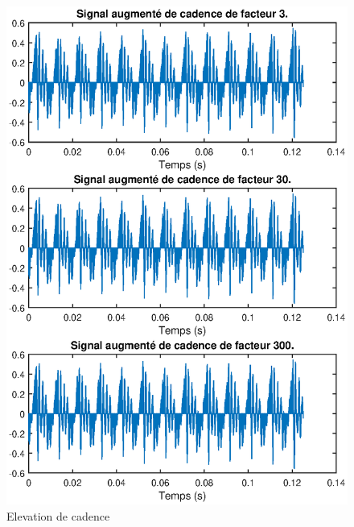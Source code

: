 \documentclass[french]{article}
\begin{document}
\begin{figure}[h!]
\begin{minipage}{0.5\textwidth}
	\centering
	\includegraphics[width=\textwidth]{images/cadence_augmente.eps}
	\caption{Elevation de cadence}
	\label{fig:élévation}
\end{minipage}
\begin{minipage}{0.5\textwidth}
	\centering

\end{minipage}
\end{figure}
\end{document}
